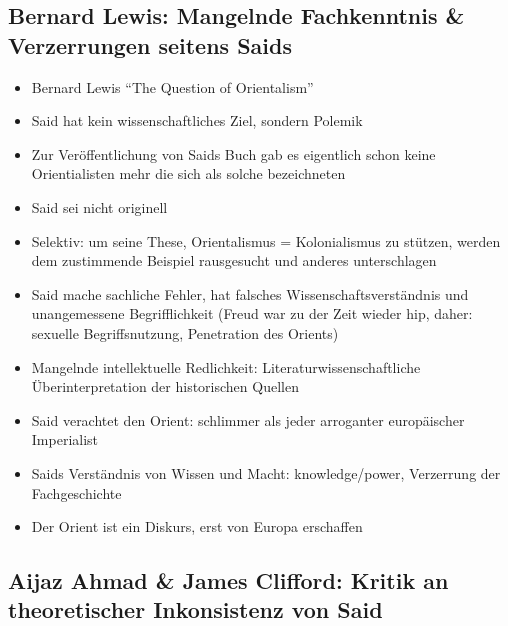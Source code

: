 \documentclass[emulatestandardclasses]{scrartcl}
\begin{document}
\subsection{Bernard Lewis: Mangelnde Fachkenntnis \& Verzerrungen seitens Saids}

\begin{itemize}
  \item Bernard Lewis "`The Question of Orientalism"'
  \item Said hat kein wissenschaftliches Ziel, sondern Polemik
  \item Zur Veröffentlichung von Saids Buch gab es eigentlich schon keine Orientialisten mehr die sich als solche bezeichneten
  \item Said sei nicht originell
  \item Selektiv: um seine These, Orientalismus = Kolonialismus zu stützen, werden dem zustimmende Beispiel rausgesucht und anderes unterschlagen
  \item Said mache sachliche Fehler, hat falsches Wissenschaftsverständnis und unangemessene Begrifflichkeit (Freud war zu der Zeit wieder hip, daher: sexuelle Begriffsnutzung, Penetration des Orients)
  \item Mangelnde intellektuelle Redlichkeit: Literaturwissenschaftliche Überinterpretation der historischen Quellen
  \item Said verachtet den Orient: schlimmer als jeder arroganter europäischer Imperialist
  \item Saids Verständnis von Wissen und Macht: knowledge/power, Verzerrung der Fachgeschichte
  \item Der Orient ist ein Diskurs, erst von Europa erschaffen
\end{itemize}


\subsection{Aijaz Ahmad \& James Clifford: Kritik an theoretischer Inkonsistenz von Said}
\end{document}
